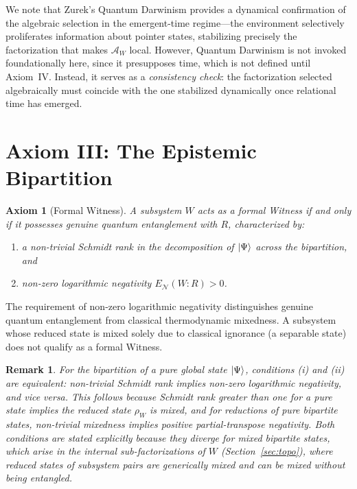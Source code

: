 \documentclass[11pt, a4paper]{article}
\newtheorem{axiom}{Axiom}
\newtheorem{remark}{Remark}
\begin{document}
We note that Zurek's Quantum Darwinism \cite{Zurek2009} provides a dynamical confirmation of the algebraic selection in the emergent-time regime---the environment selectively proliferates information about pointer states, stabilizing precisely the factorization that makes $\mathcal{A}_W$ local. However, Quantum Darwinism is not invoked foundationally here, since it presupposes time, which is not defined until Axiom~IV. Instead, it serves as a \emph{consistency check}: the factorization selected algebraically must coincide with the one stabilized dynamically once relational time has emerged.

\section{Axiom III: The Epistemic Bipartition}
\label{sec:axiom3}

\begin{axiom}[Formal Witness]
A subsystem $W$ acts as a \emph{formal Witness} if and only if it possesses genuine quantum entanglement with $R$, characterized by:
\begin{enumerate}[label=(\roman*)]
    \item a non-trivial Schmidt rank in the decomposition of $\ket{\Psi}$ across the bipartition, and
    \item non-zero logarithmic negativity $E_{\mathcal{N}}(W{:}R) > 0$.
\end{enumerate}
\end{axiom}

The requirement of non-zero logarithmic negativity distinguishes genuine quantum entanglement from classical thermodynamic mixedness. A subsystem whose reduced state is mixed solely due to classical ignorance (a separable state) does not qualify as a formal Witness.

\begin{remark}
For the bipartition of a pure global state $\ket{\Psi}$, conditions (i) and (ii) are equivalent: non-trivial Schmidt rank implies non-zero logarithmic negativity, and vice versa. This follows because Schmidt rank greater than one for a pure state implies the reduced state $\rho_W$ is mixed, and for reductions of pure bipartite states, non-trivial mixedness implies positive partial-transpose negativity. Both conditions are stated explicitly because they diverge for mixed bipartite states, which arise in the internal sub-factorizations of $W$ (Section~\ref{sec:topo}), where reduced states of subsystem pairs are generically mixed and can be mixed without being entangled.
\end{remark}
\end{document}
